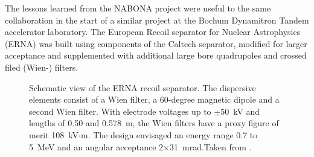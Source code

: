 The lessons learned from the NABONA project were useful to the same collaboration in the start of a similar project at the Bochum Dynamitron Tandem accelerator laboratory. The European Recoil separator for Nuclear Astrophysics (ERNA) was built using components of the Caltech separator, modified for larger acceptance and supplemented with additional large bore quadrupoles and crossed filed (Wien-) filters.
\begin{figure}
\caption{Schematic view of the ERNA recoil separator. The dispersive elements consist of a Wien filter, a 60-degree magnetic dipole and a second Wien filter.    With electrode voltages up to $\pm$50~kV and lengths of 0.50 and 0.578~m, the Wien filters have a proxy figure of merit 108~kV$\cdot$m.   The design envisaged an energy range 0.7 to 5~MeV and an angular acceptance 2$\times$31~mrad.Taken from \cite{dile08}.}
\label{fig:erna}       %
\end{figure}
